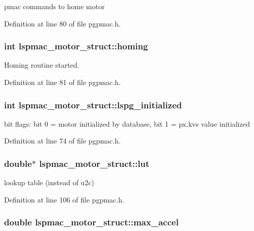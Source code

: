 pmac commands to home motor 

Definition at line 80 of file pgpmac.h.\hypertarget{structlspmac__motor__struct_aa74108855693f94fc2ff76333c9fb6ac}{
\subsubsection[{homing}]{\setlength{\rightskip}{0pt plus 5cm}int {\bf lspmac\_\-motor\_\-struct::homing}}}
\label{structlspmac__motor__struct_aa74108855693f94fc2ff76333c9fb6ac}


Homing routine started. 

Definition at line 81 of file pgpmac.h.\hypertarget{structlspmac__motor__struct_af11e5f75c1cf88ed6842d04154d27a31}{
\subsubsection[{lspg\_\-initialized}]{\setlength{\rightskip}{0pt plus 5cm}int {\bf lspmac\_\-motor\_\-struct::lspg\_\-initialized}}}
\label{structlspmac__motor__struct_af11e5f75c1cf88ed6842d04154d27a31}


bit flags: bit 0 = motor initialized by database, bit 1 = px.kvs value initialized 

Definition at line 74 of file pgpmac.h.\hypertarget{structlspmac__motor__struct_a7b43671f7f3e06521f6cf91fb9ac707d}{
\subsubsection[{lut}]{\setlength{\rightskip}{0pt plus 5cm}double$\ast$ {\bf lspmac\_\-motor\_\-struct::lut}}}
\label{structlspmac__motor__struct_a7b43671f7f3e06521f6cf91fb9ac707d}


lookup table (instead of u2c) 

Definition at line 106 of file pgpmac.h.\hypertarget{structlspmac__motor__struct_afec8dc1d4b97ba9c1d6e4f7a088342e4}{
\subsubsection[{max\_\-accel}]{\setlength{\rightskip}{0pt plus 5cm}double {\bf lspmac\_\-motor\_\-struct::max\_\-accel}}}
\label{structlspmac__motor__struct_afec8dc1d4b97ba9c1d6e4f7a088342e4}


